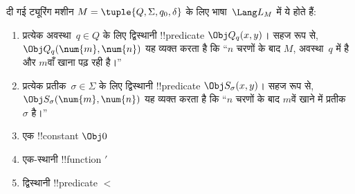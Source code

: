 \documentclass[../../../include/open-logic-section]{subfiles}
\begin{document}
\begin{defn}
दी गई ट्यूरिंग मशीन $M = \tuple{Q, \Sigma, q_0, \delta}$ के लिए
भाषा~$\Lang L_M$ में ये होते हैं:
\begin{enumerate}
\item प्रत्येक अवस्था~$q \in Q$ के लिए द्विस्थानी !!{predicate}
  $\Obj Q_q(x, y)$। सहज रूप से, $\Obj Q_q(\num{m}, \num{n})$ यह व्यक्त
  करता है कि ``$n$ चरणों के बाद $M$, अवस्था~$q$ में है और $m$वाँ खाना
  पढ़ रही है।''
\item प्रत्येक प्रतीक~$\sigma\in \Sigma$ के लिए द्विस्थानी !!{predicate}
  $\Obj S_\sigma(x, y)$। सहज रूप से, $\Obj S_\sigma(\num{m}, \num{n})$
  यह व्यक्त करता है कि ``$n$ चरणों के बाद $m$वें खाने में प्रतीक
  ~$\sigma$ है।''
\item एक !!{constant} $\Obj 0$
\item एक-स्थानी !!{function} $\prime$
\item द्विस्थानी !!{predicate} $<$
\end{enumerate}
\end{defn}
\end{document}
